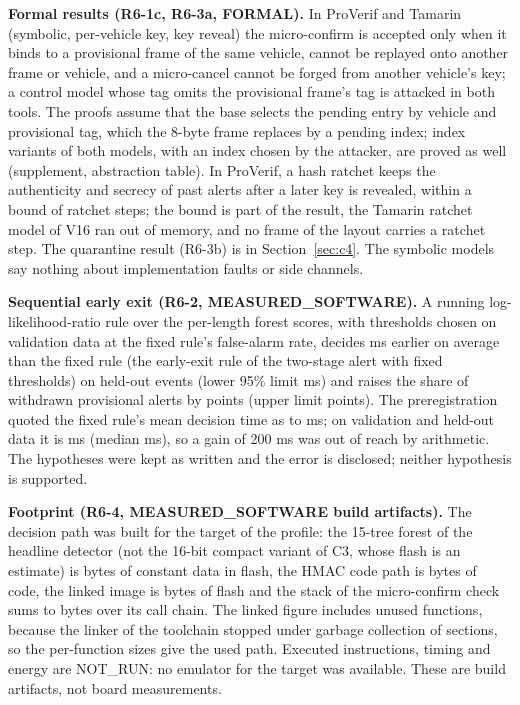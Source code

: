 \documentclass{ieeeaccess}
\begin{document}
\textbf{Formal results (R6-1c, R6-3a, FORMAL).} In ProVerif and Tamarin (symbolic, per-vehicle key, key reveal) the micro-confirm is accepted only when it binds to a provisional frame of the same vehicle, cannot be replayed onto another frame or vehicle, and a micro-cancel cannot be forged from another vehicle's key; a control model whose tag omits the provisional frame's tag is attacked in both tools. The proofs assume that the base selects the pending entry by vehicle and provisional tag, which the 8-byte frame replaces by a pending index; index variants of both models, with an index chosen by the attacker, are proved as well (supplement, abstraction table). In ProVerif, a hash ratchet keeps the authenticity and secrecy of past alerts after a later key is revealed, within a bound of \RSixRatchetSteps{} ratchet steps; the bound is part of the result, the Tamarin ratchet model of V16 ran out of memory, and no frame of the layout carries a ratchet step. The quarantine result (R6-3b) is in Section~\ref{sec:c4}. The symbolic models say nothing about implementation faults or side channels.

\textbf{Sequential early exit (R6-2, MEASURED\_SOFTWARE).} A running log-likelihood-ratio rule over the per-length forest scores, with thresholds chosen on validation data at the fixed rule's false-alarm rate, decides \RSixSeqGain{} ms earlier on average than the fixed rule (the early-exit rule of the two-stage alert with fixed thresholds) on \RSixHeldEvents{} held-out events (lower 95\% limit \RSixSeqGainLo{} ms) and raises the share of withdrawn provisional alerts by \RSixSeqRetractRise{} points (upper limit \RSixSeqRetractHi{} points). The preregistration quoted the fixed rule's mean decision time as \RSixPreregLo{} to \RSixPreregHi{} ms; on validation and held-out data it is \RSixFixedMeanMs{} ms (median \RSixFixedMedMs{} ms), so a gain of 200 ms was out of reach by arithmetic. The hypotheses were kept as written and the error is disclosed; neither hypothesis is supported.

\textbf{Footprint (R6-4, MEASURED\_SOFTWARE build artifacts).} The decision path was built for the target of the profile: the 15-tree forest of the headline detector (not the 16-bit compact variant of C3, whose flash is an estimate) is \RSixForestBytes{} bytes of constant data in flash, the HMAC code path is \RSixHmacCodeBytes{} bytes of code, the linked image is \RSixFlashBytes{} bytes of flash and the stack of the micro-confirm check sums to \RSixStackChain{} bytes over its call chain. The linked figure includes unused functions, because the linker of the toolchain stopped under garbage collection of sections, so the per-function sizes give the used path. Executed instructions, timing and energy are NOT\_RUN: no emulator for the target was available. These are build artifacts, not board measurements.
\end{document}
